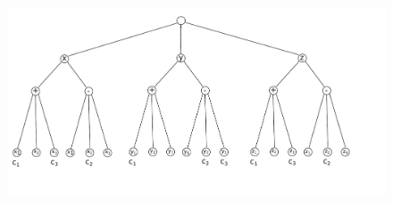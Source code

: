 \documentclass[9pt,twocolumn]{scrartcl}
\begin{document}
\begin{appendix}
\begin{figure}[htbp]
\includegraphics[width = \columnwidth]{figs/formula-example}
\end{figure}


\end{appendix}
\end{document}
